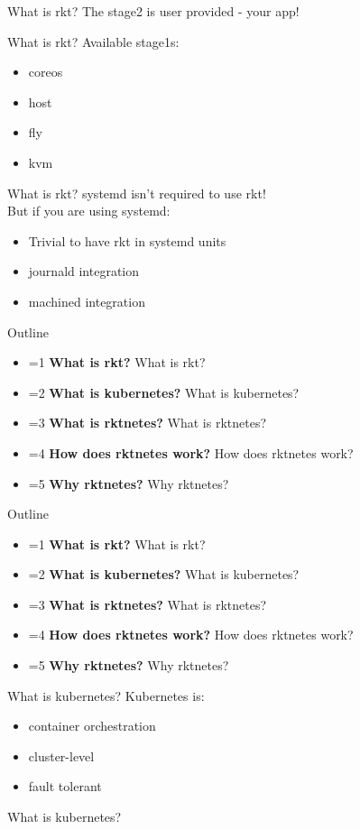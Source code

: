 \documentclass[pdf,aspectratio=169,14pt]{beamer}
\newcommand{\mbold}[3]{
    \ifnum #1=#2
        \textbf{#3}
    \else
        #3
    \fi
}
\newcommand{\outline}[1]{
    \begin{frame}
        Outline
        \begin{itemize}
            \item \mbold{#1}{1}{What is rkt?}
            \item \mbold{#1}{2}{What is kubernetes?}
            \item \mbold{#1}{3}{What is rktnetes?}
            \item \mbold{#1}{4}{How does rktnetes work?}
            \item \mbold{#1}{5}{Why rktnetes?}
        \end{itemize}
    \end{frame}
}
\begin{document}
\begin{frame}{What is rkt?}
    The stage2 is user provided - your app!
\end{frame}

\begin{frame}{What is rkt?}
    Available stage1s:
    \begin{itemize}
        \item<2-> coreos
        \item<3-> host
        \item<4-> fly
        \item<5-> kvm
    \end{itemize}
\end{frame}

\begin{frame}{What is rkt?}
    systemd isn't required to use rkt! \\
    \vspace{1em}
    \pause
    But if you are using systemd:
    \begin{itemize}
        \item<2-> Trivial to have rkt in systemd units
        \item<3-> journald integration
        \item<4-> machined integration
    \end{itemize}
\end{frame}


\outline{1}
\outline{2}

\begin{frame}{What is kubernetes?}
    Kubernetes is:
    \begin{itemize}
        \item container orchestration
        \item cluster-level
        \item fault tolerant
    \end{itemize}
\end{frame}

\begin{frame}{What is kubernetes?}
\end{frame}
\end{document}
